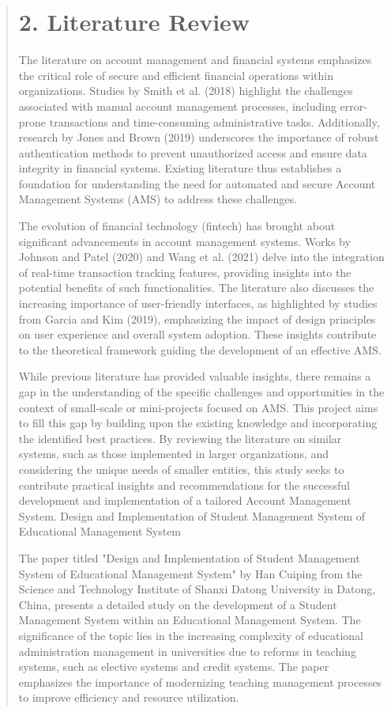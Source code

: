 \documentclass[12pt]{report}
\begin{document}
	\begin{quote}
		\section{2. Literature Review}
	The literature on account management and financial systems emphasizes the critical role of secure and efficient financial operations within organizations. Studies by Smith et al. (2018) highlight the challenges associated with manual account management processes, including error-prone transactions and time-consuming administrative tasks. Additionally, research by Jones and Brown (2019) underscores the importance of robust authentication methods to prevent unauthorized access and ensure data integrity in financial systems. Existing literature thus establishes a foundation for understanding the need for automated and secure Account Management Systems (AMS) to address these challenges.
	
	The evolution of financial technology (fintech) has brought about significant advancements in account management systems. Works by Johnson and Patel (2020) and Wang et al. (2021) delve into the integration of real-time transaction tracking features, providing insights into the potential benefits of such functionalities. The literature also discusses the increasing importance of user-friendly interfaces, as highlighted by studies from Garcia and Kim (2019), emphasizing the impact of design principles on user experience and overall system adoption. These insights contribute to the theoretical framework guiding the development of an effective AMS.
	
	While previous literature has provided valuable insights, there remains a gap in the understanding of the specific challenges and opportunities in the context of small-scale or mini-projects focused on AMS. This project aims to fill this gap by building upon the existing knowledge and incorporating the identified best practices. By reviewing the literature on similar systems, such as those implemented in larger organizations, and considering the unique needs of smaller entities, this study seeks to contribute practical insights and recommendations for the successful development and implementation of a tailored Account Management System.
	 Design and Implementation of Student Management System of Educational
	Management System 
	
	The paper titled "Design and Implementation of Student Management System of Educational Management System" by Han Cuiping from the Science and Technology Institute of Shanxi Datong University in Datong, China, presents a detailed study on the development of a Student Management System within an Educational Management System. The significance of the topic lies in the increasing complexity of educational administration management in universities due to reforms in teaching systems, such as elective systems and credit systems. The paper emphasizes the importance of modernizing teaching management processes to improve efficiency and resource utilization.
	

\end{quote}
\end{document}
